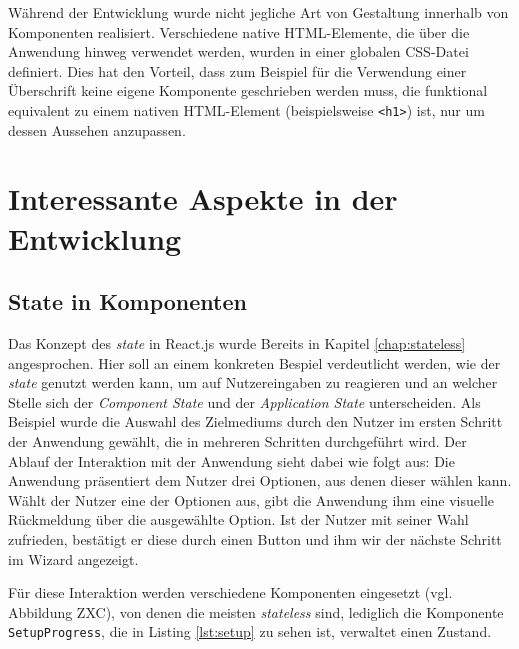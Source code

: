 Während der Entwicklung wurde nicht jegliche Art von Gestaltung innerhalb von Komponenten realisiert. Verschiedene native HTML-Elemente, die über die Anwendung hinweg verwendet werden, wurden in einer globalen CSS-Datei definiert. Dies hat den Vorteil, dass zum Beispiel für die Verwendung einer Überschrift keine eigene Komponente geschrieben werden muss, die funktional equivalent zu einem nativen HTML-Element (beispielsweise \verb|<h1>|) ist, nur um dessen Aussehen anzupassen.

\section{Interessante Aspekte in der Entwicklung}

\subsection{State in Komponenten}
\label{chap:state_component}
Das Konzept des \textit{state} in React.js wurde Bereits in Kapitel \ref{chap:stateless} angesprochen. Hier soll an einem konkreten Bespiel verdeutlicht werden, wie der \textit{state} genutzt werden kann, um auf Nutzereingaben zu reagieren und an welcher Stelle sich der \textit{Component State} und der \textit{Application State} unterscheiden.
Als Beispiel wurde die Auswahl des Zielmediums durch den Nutzer im ersten Schritt der Anwendung gewählt, die in mehreren Schritten durchgeführt wird.
Der Ablauf der Interaktion mit der Anwendung sieht dabei wie folgt aus:
Die Anwendung präsentiert dem Nutzer drei Optionen, aus denen dieser wählen kann. Wählt der Nutzer eine der Optionen aus, gibt die Anwendung ihm eine visuelle Rückmeldung über die ausgewählte Option. Ist der Nutzer mit seiner Wahl zufrieden, bestätigt er diese durch einen Button und  ihm wir der nächste Schritt im Wizard angezeigt.

Für diese Interaktion werden verschiedene Komponenten eingesetzt (vgl. Abbildung ZXC), von denen die meisten \textit{stateless} sind, lediglich die Komponente \verb|SetupProgress|, die in Listing \ref{lst:setup} zu sehen ist\footnotemark{}, verwaltet einen Zustand.


